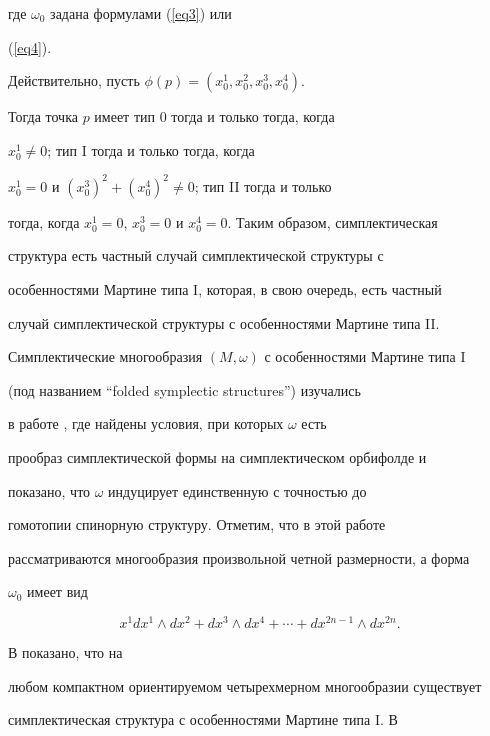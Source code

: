 где $\omega_0$ задана формулами (\ref{eq3}) или


(\ref{eq4}).


Действительно, пусть $\phi(p) = (x^1_0, x^2_0, x^3_0, x^4_0)$.


Тогда точка $p$ имеет тип 0 тогда и только тогда, когда


$x^1_0\ne 0$; тип I тогда и только тогда, когда


$x^1_0=0$ и $(x^3_0)^2 + (x^4_0)^2 \ne 0$; тип II тогда и только


тогда, когда $x^1_0=0$, $x^3_0=0$ и $x^4_0=0$. Таким образом, симплектическая


структура есть частный случай симплектической структуры с


особенностями Мартине типа I, которая, в свою очередь, есть частный


случай симплектической структуры с особенностями Мартине типа II.








Симплектические многообразия $(M,\omega)$ с особенностями Мартине типа I


(под названием ``folded symplectic structures'') изучались


в работе \cite{SGW}, где найдены условия, при которых $\omega$ есть


прообраз симплектической формы на симплектическом орбифолде и


показано, что $\omega$ индуцирует единственную с точностью до


гомотопии спинорную структуру. Отметим, что в этой работе


рассматриваются многообразия произвольной четной размерности, а форма


$\omega_0$ имеет вид


\begin{equation}


 \label{eq5}


x^1 dx^1 \wedge dx^2 + dx^3 \wedge dx^4 + \dotsb + dx^{2n-1}\wedge dx^{2n}.


\end{equation}





В \cite{S} показано, что на


любом компактном ориентируемом четырехмерном многообразии существует


симплектическая структура с особенностями Мартине типа I. В \cite{D1}


